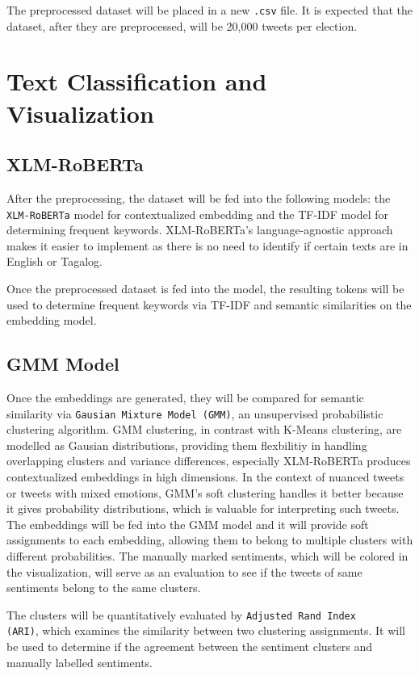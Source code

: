 The preprocessed dataset will be placed in a new \texttt{.csv} file. It is expected that the dataset, after they are preprocessed, will be 20,000 tweets per election.

\section{Text Classification and Visualization}
\subsection{XLM-RoBERTa}
After the preprocessing, the dataset will be fed into the following models: the \texttt{XLM-RoBERTa} model for contextualized embedding and the TF-IDF model for determining frequent keywords. XLM-RoBERTa’s language-agnostic approach makes it easier to implement as there is no need to identify if certain texts are in English or Tagalog.

Once the preprocessed dataset is fed into the model, the resulting tokens will be used to determine frequent keywords via TF-IDF and semantic similarities on the embedding model.

\subsection{GMM Model}
Once the embeddings are generated, they will be compared for semantic similarity via \texttt{Gausian Mixture Model (GMM)}, an unsupervised probabilistic clustering algorithm. GMM clustering, in contrast with K-Means clustering, are modelled as Gausian distributions, providing them flexbilitiy in handling overlapping clusters and variance differences, especially XLM-RoBERTa produces contextualized embeddings in high dimensions. In the context of nuanced tweets or tweets with mixed emotions, GMM’s soft clustering handles it better because it gives probability distributions, which is valuable for interpreting such tweets. The embeddings will be fed into the GMM model and it will provide soft assignments to each embedding, allowing them to belong to multiple clusters with different probabilities. The manually marked sentiments, which will be colored in the visualization, will serve as an evaluation to see if the tweets of same sentiments belong to the same clusters.

The clusters will be quantitatively evaluated by \texttt{Adjusted Rand Index\\(ARI)}, which examines the similarity between two clustering assignments. It will be used to determine if the agreement between the sentiment clusters and manually labelled sentiments.


